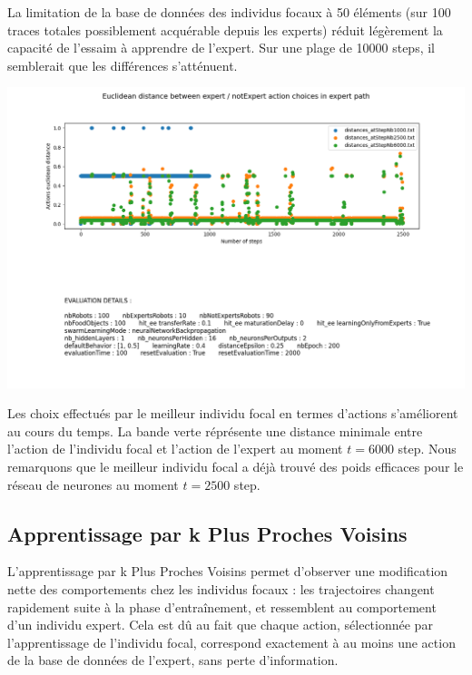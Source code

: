 \documentclass[a4paper, 12pt]{report}
\begin{document}
    La limitation de la base de données des individus focaux à 50 éléments (sur 100 traces totales possiblement acquérable depuis les experts) réduit légèrement la capacité de l'essaim à apprendre de l'expert. 
    Sur une plage de 10000 steps, il semblerait que les différences s'atténuent.


    \includegraphics[scale=0.5]{distances_bp.png}


    Les choix effectués par le meilleur individu focal en termes d'actions s'améliorent au cours du temps. La bande verte réprésente une distance minimale entre l'action de l'individu focal et l'action de l'expert au moment $t = 6000$ step.
    Nous remarquons que le meilleur individu focal a déjà trouvé des poids efficaces pour le réseau de neurones au moment $t = 2500$ step. 





    \subsection{Apprentissage par k Plus Proches Voisins}
    
    L'apprentissage par k Plus Proches Voisins permet d'observer une modification nette des comportements chez les individus focaux : les trajectoires changent rapidement suite à la phase d'entraînement, et ressemblent au comportement d'un individu expert. Cela est dû au fait que chaque action, sélectionnée par l'apprentissage de l'individu focal, correspond exactement à au moins une action de la base de données de l'expert, sans perte d'information.
    
\end{document}
